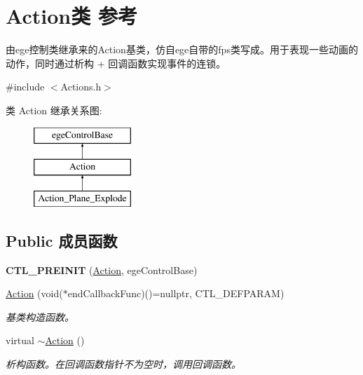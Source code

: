 \hypertarget{class_action}{}\section{Action类 参考}
\label{class_action}


由ege控制类继承来的\+Action基类，仿自ege自带的fps类写成。用于表现一些动画的动作，同时通过析构 + 回调函数实现事件的连锁。  




{\ttfamily \#include $<$Actions.\+h$>$}

类 Action 继承关系图\+:\begin{figure}[H]
\begin{center}
\leavevmode
\includegraphics[height=3.000000cm]{class_action}
\end{center}
\end{figure}
\subsection*{Public 成员函数}
\begin{DoxyCompactItemize}
\item 
\mbox{\label{class_action_a4d1309da871dfc1da7b4bdc896e34c0e}} 
{\bfseries C\+T\+L\+\_\+\+P\+R\+E\+I\+N\+IT} (\hyperlink{class_action}{Action}, ege\+Control\+Base)
\item 
\hyperlink{class_action_a5c92cef33ffb1fbf67d7d65e3f74a361}{Action} (void($\ast$end\+Callback\+Func)()=nullptr, C\+T\+L\+\_\+\+D\+E\+F\+P\+A\+R\+AM)
\begin{DoxyCompactList}\small\item\em 基类构造函数。 \end{DoxyCompactList}\item 
virtual \hyperlink{class_action_abcf4c6358f53a666631ace11b325a7cd}{$\sim$\+Action} ()
\begin{DoxyCompactList}\small\item\em 析构函数。在回调函数指针不为空时，调用回调函数。 \end{DoxyCompactList}\end{DoxyCompactItemize}
